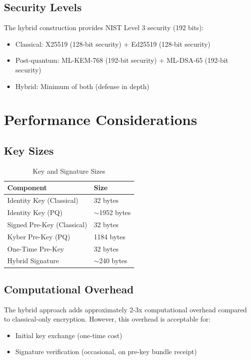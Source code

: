 \documentclass[12pt,a4paper]{article}
\begin{document}
\subsection{Security Levels}

The hybrid construction provides NIST Level 3 security (192 bits):

\begin{itemize}
    \item Classical: X25519 (128-bit security) + Ed25519 (128-bit security)
    \item Post-quantum: ML-KEM-768 (192-bit security) + ML-DSA-65 (192-bit security)
    \item Hybrid: Minimum of both (defense in depth)
\end{itemize}

\section{Performance Considerations}

\subsection{Key Sizes}

\begin{table}[h]
\centering
\caption{Key and Signature Sizes}
\begin{tabular}{@{}ll@{}}
\toprule
Component & Size \\ \midrule
Identity Key (Classical) & 32 bytes \\
Identity Key (PQ) & $\sim$1952 bytes \\
Signed Pre-Key (Classical) & 32 bytes \\
Kyber Pre-Key (PQ) & 1184 bytes \\
One-Time Pre-Key & 32 bytes \\
Hybrid Signature & $\sim$240 bytes \\ \bottomrule
\end{tabular}
\end{table}

\subsection{Computational Overhead}

The hybrid approach adds approximately 2-3x computational overhead compared to classical-only encryption. However, this overhead is acceptable for:
\begin{itemize}
    \item Initial key exchange (one-time cost)
    \item Signature verification (occasional, on pre-key bundle receipt)
\end{itemize}
\end{document}
